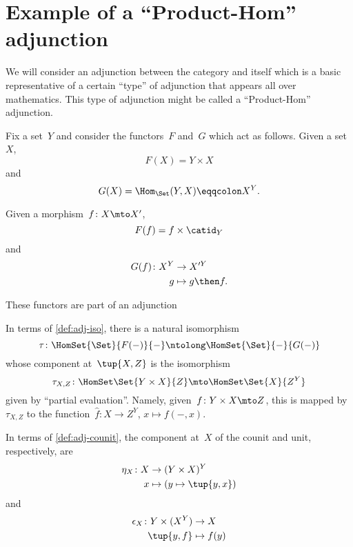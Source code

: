 \section{Example of a ``Product-Hom'' adjunction}
We will consider an adjunction between the category \Set and itself which is a basic representative of a certain ``type'' of adjunction that appears all over mathematics. This type of adjunction might be called a ``Product-Hom'' adjunction.


Fix a set~$Y$ and consider the functors~$F$ and~$G$ which act as follows. Given a set~$X$,
\begin{equation*}
  F(X) = Y \times X
\end{equation*}
and
\begin{equation*}
  G(X) = \Hom_{\Set}(Y, X) \eqqcolon X^Y.
\end{equation*}

Given a morphism~$f\colon X \mto X'$,
\begin{equation*}
  F(f) = f \times \catid_Y
\end{equation*}
and
\begin{equation*}
  \begin{aligned}
    G(f)\colon X^Y &\to X'^Y\\
    g &\mapsto g \then f.
  \end{aligned}
\end{equation*}

These functors are part of an adjunction

\begin{center}
\end{center}
In terms of \cref{def:adj-iso}, there is a natural isomorphism
\begin{equation*}
  \tau\colon \HomSet{\Set}{F(- )}{-}  \ntolong   \HomSet{\Set}{-}{G( - )}
\end{equation*}
whose component at~$\tup{X,Z}$ is the isomorphism
\begin{equation*}
  \tau_{X,Z} \colon \HomSet\Set{Y\times X}{Z} \mto \HomSet\Set{X}{Z^Y}
\end{equation*}
given by ``partial evaluation''. Namely, given~$f\colon Y \times X \mto Z$,  this is mapped by~$\tau_{X,Z}$ to the function~$\hat f\colon X \to Z^Y$, $x \mapsto f( -, x)$.

In terms of \cref{def:adj-counit}, the component at~$X$ of the counit and unit, respectively, are
\begin{equation*}
  \begin{aligned}
    \eta_X \colon X &\to  (Y \times X)^Y\\
    x &\mapsto (y \mapsto \tup{y,x})
  \end{aligned}
\end{equation*}
and
\begin{equation*}
  \begin{aligned}
    \epsilon_X \colon Y \times (X^Y) &\to X\\
    \tup{y,f} &\mapsto f(y)
  \end{aligned}
\end{equation*}
